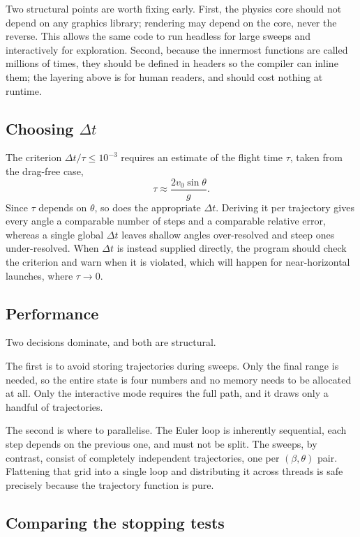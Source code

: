 \documentclass[11pt]{article}
\begin{document}
Two structural points are worth fixing early. First, the physics core
should not depend on any graphics library; rendering may depend on
the core, never the reverse. This allows the same code to run
headless for large sweeps and interactively for exploration. Second,
because the innermost functions are called millions of times, they
should be defined in headers so the compiler can inline them; the
layering above is for human readers, and should cost nothing at
runtime.

\subsection{Choosing $\Delta t$}

The criterion $\Delta t/\tau \leq 10^{-3}$ requires an estimate of the
flight time $\tau$, taken from the drag-free case,
\begin{equation}
    \tau \approx \frac{2 v_0 \sin\theta}{g} .
\end{equation}
Since $\tau$ depends on $\theta$, so does the appropriate $\Delta t$.
Deriving it per trajectory gives every angle a comparable number of
steps and a comparable relative error, whereas a single global
$\Delta t$ leaves shallow angles over-resolved and steep ones
under-resolved. When $\Delta t$ is instead supplied directly, the
program should check the criterion and warn when it is violated,
which will happen for near-horizontal launches, where $\tau \to 0$.

\subsection{Performance}

Two decisions dominate, and both are structural.

The first is to avoid storing trajectories during sweeps. Only the
final range is needed, so the entire state is four numbers and no
memory needs to be allocated at all. Only the interactive mode
requires the full path, and it draws only a handful of trajectories.

The second is where to parallelise. The Euler loop is inherently
sequential, each step depends on the previous one, and must not
be split. The sweeps, by contrast, consist of completely independent
trajectories, one per $(\beta, \theta)$ pair. Flattening that grid
into a single loop and distributing it across threads is safe
precisely because the trajectory function is pure.

\subsection{Comparing the stopping tests}
\end{document}
